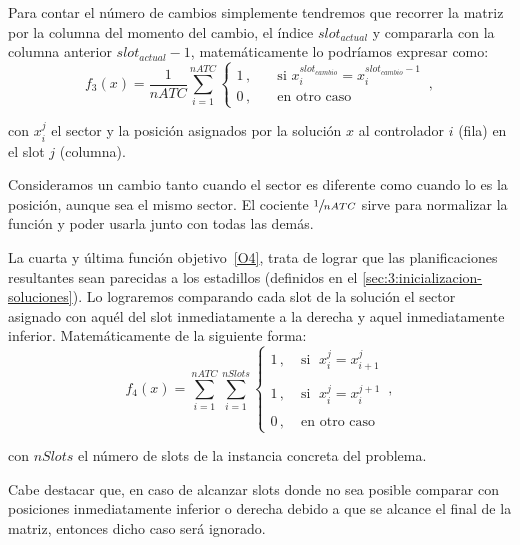 Para contar el número de cambios simplemente tendremos que recorrer la matriz por la columna del momento del cambio, el índice $slot_{actual}$ y compararla con la columna anterior $slot_{actual}-1$, matemáticamente lo podríamos expresar como:
%
\[
    f_3(x) = \frac{1}{nATC} \sum_{i=1}^{nATC}
    \begin{cases}
        1\,, & \quad \textrm{si } x_i^{slot_{cambio}} = x_i^{slot_{cambio}-1} \\
        0\,, & \quad \textrm{en otro caso }
    \end{cases}
    \,,
\]



con $x_i^j$ el sector y la posición asignados por la solución $x$ al controlador $i$ (fila) en el slot $j$ (columna).

Consideramos un cambio tanto cuando el sector es diferente como cuando lo es la posición, aunque sea el mismo sector.
El cociente $\sfrac{1}{nATC}$ sirve para normalizar la función y poder usarla junto con todas las demás.

La cuarta y última función objetivo~\ref{O4}, trata de lograr que las planificaciones resultantes sean parecidas a los estadillos (definidos en el \autoref{sec:3:inicializacion-soluciones}). Lo lograremos comparando cada slot de la solución el sector asignado con aquél del slot inmediatamente a la derecha y aquel inmediatamente inferior. Matemáticamente de la siguiente forma:
%
\[
    f_4(x) = \sum_{i=1}^{nATC} \sum_{i=1}^{nSlots}
    \begin{cases}
        1\,, & \; \textrm{si } \; x_i^j = x_{i+1}^{j} \\
        \\
        1\,, & \; \textrm{si } \; x_i^j = x_{i}^{j+1}   \\
        \\
        0\,, & \; \textrm{en otro caso }
    \end{cases}
    \,,
\]

con $nSlots$ el número de slots de la instancia concreta del problema. 

Cabe destacar que, en caso de alcanzar slots
donde no sea posible comparar con posiciones inmediatamente inferior o derecha debido a que se alcance el final de la matriz, entonces dicho caso será ignorado.

